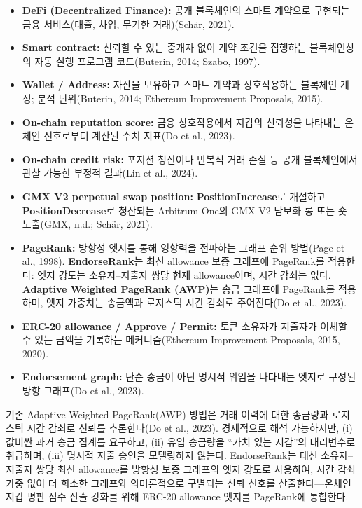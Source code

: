 \begin{itemize}
\item \textbf{DeFi (Decentralized Finance):} 공개 블록체인의 스마트 계약으로 구현되는 금융 서비스(대출, 차입, 무기한 거래)(Sch\"{a}r, 2021).
\item \textbf{Smart contract:} 신뢰할 수 있는 중개자 없이 계약 조건을 집행하는 블록체인상의 자동 실행 프로그램 코드(Buterin, 2014; Szabo, 1997).
\item \textbf{Wallet / Address:} 자산을 보유하고 스마트 계약과 상호작용하는 블록체인 계정; 분석 단위(Buterin, 2014; Ethereum Improvement Proposals, 2015).
\item \textbf{On-chain reputation score:} 금융 상호작용에서 지갑의 신뢰성을 나타내는 온체인 신호로부터 계산된 수치 지표(Do et al., 2023).
\item \textbf{On-chain credit risk:} 포지션 청산이나 반복적 거래 손실 등 공개 블록체인에서 관찰 가능한 부정적 결과(Lin et al., 2024).
\item \textbf{GMX V2 perpetual swap position:} \textbf{PositionIncrease}로 개설하고 \textbf{PositionDecrease}로 청산되는 Arbitrum One의 GMX V2 담보화 롱 또는 숏 노출(GMX, n.d.; Sch\"{a}r, 2021).
\item \textbf{PageRank:} 방향성 엣지를 통해 영향력을 전파하는 그래프 순위 방법(Page et al., 1998). \textbf{EndorseRank}는 최신 allowance 보증 그래프에 PageRank를 적용한다: 엣지 강도는 소유자--지출자 쌍당 현재 allowance이며, 시간 감쇠는 없다. \textbf{Adaptive Weighted PageRank (AWP)}는 송금 그래프에 PageRank를 적용하며, 엣지 가중치는 송금액과 로지스틱 시간 감쇠로 주어진다(Do et al., 2023).
\item \textbf{ERC-20 allowance / Approve / Permit:} 토큰 소유자가 지출자가 이체할 수 있는 금액을 기록하는 메커니즘(Ethereum Improvement Proposals, 2015, 2020).
\item \textbf{Endorsement graph:} 단순 송금이 아닌 명시적 위임을 나타내는 엣지로 구성된 방향 그래프(Do et al., 2023).
\end{itemize}


기존 Adaptive Weighted PageRank(AWP) 방법은 거래 이력에 대한 송금량과 로지스틱 시간 감쇠로 신뢰를 추론한다(Do et al., 2023). 경제적으로 해석 가능하지만, (i) 값비싼 과거 송금 집계를 요구하고, (ii) 유입 송금량을 ``가치 있는 지갑''의 대리변수로 취급하며, (iii) 명시적 지출 승인을 모델링하지 않는다. EndorseRank는 대신 소유자--지출자 쌍당 최신 allowance를 방향성 보증 그래프의 엣지 강도로 사용하여, 시간 감쇠 가중 없이 더 희소한 그래프와 의미론적으로 구별되는 신뢰 신호를 산출한다---온체인 지갑 평판 점수 산출 강화를 위해 ERC-20 allowance 엣지를 PageRank에 통합한다.

